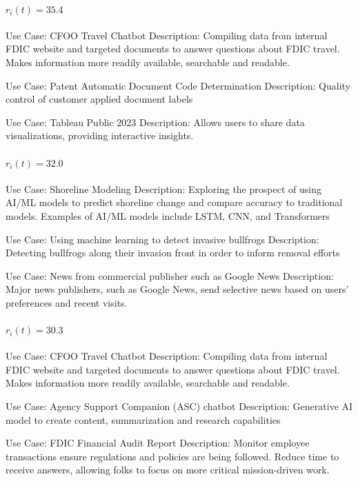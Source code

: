 \paragraph{$r_i(t) = 35.4$}
\begin{description}[style=nextline,leftmargin=1em,font=\normalfont\bfseries]
  \item[Anchor] Use Case: CFOO Travel Chatbot
Description: Compiling data from internal FDIC website and targeted documents to answer questions about FDIC travel. Makes information more readily available, searchable and readable.
  \item[Human-judged closer] Use Case: Patent Automatic Document Code Determination
Description: Quality control of customer applied document labels
  \item[Human-judged farther] Use Case: Tableau Public 2023
Description: Allows users to share data visualizations, providing interactive insights.
\end{description}
\paragraph{$r_i(t) = 32.0$}
\begin{description}[style=nextline,leftmargin=1em,font=\normalfont\bfseries]
  \item[Anchor] Use Case: Shoreline Modeling
Description: Exploring the prospect of using AI/ML models to predict shoreline change and compare accuracy to traditional models. Examples of AI/ML models include LSTM, CNN, and Transformers
  \item[Human-judged closer] Use Case: Using machine learning to detect invasive bullfrogs
Description: Detecting bullfrogs along their invasion front in order to inform removal efforts
  \item[Human-judged farther] Use Case: News from commercial publisher such as Google News
Description: Major news publishers, such as Google News, send selective news based on users' preferences and recent visits. 
\end{description}
\paragraph{$r_i(t) = 30.3$}
\begin{description}[style=nextline,leftmargin=1em,font=\normalfont\bfseries]
  \item[Anchor] Use Case: CFOO Travel Chatbot
Description: Compiling data from internal FDIC website and targeted documents to answer questions about FDIC travel. Makes information more readily available, searchable and readable.
  \item[Human-judged closer] Use Case: Agency Support Companion (ASC) chatbot
Description: Generative AI model to create content, summarization and research capabilities
  \item[Human-judged farther] Use Case: FDIC Financial Audit Report
Description: Monitor employee transactions ensure regulations and policies are being followed. Reduce time to receive answers, allowing folks to focus on more critical mission-driven work.
\end{description}
